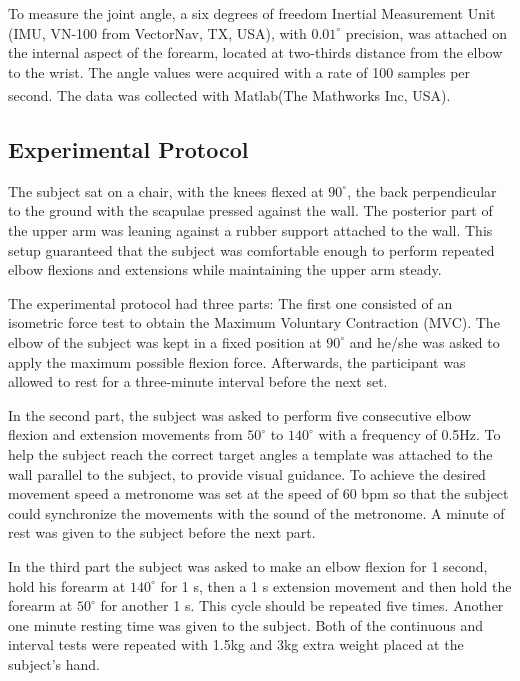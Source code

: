 \documentclass[letterpaper, 10 pt, conference]{ieeeconf}  %
\begin{document}
  To measure the joint angle, a six degrees of freedom Inertial Measurement Unit (IMU, VN-100 from VectorNav, TX, USA), with \(0.01^{\circ}\) precision, was attached on the internal aspect of the forearm, located at two-thirds distance from the elbow to the wrist. The angle values were acquired with a rate of 100 samples per second. The data was collected with Matlab\textsuperscript{\textregistered}(The Mathworks Inc, USA).

\subsection{Experimental Protocol}


The subject sat on a chair, with the knees flexed at \(90^{\circ}\), the back perpendicular to the ground with the scapulae pressed against the wall. The posterior part of the upper arm was leaning against a rubber support attached to the wall. This setup guaranteed that the subject was comfortable enough to perform repeated elbow flexions and extensions while maintaining the upper arm steady. 

The experimental protocol had three parts: The first one consisted of an isometric force test to obtain the Maximum Voluntary Contraction (MVC). The elbow of the subject was kept in a fixed position at \(90^{\circ}\) and he/she was asked to apply the maximum possible flexion force. Afterwards, the participant was allowed to rest for a three-minute interval before the next set.

In the second part, the subject was asked to perform five consecutive elbow flexion and extension movements from  \(50^{\circ}\) to \(140^{\circ}\) with a frequency of 0.5Hz. To help the subject reach the correct target angles a template was attached to the wall parallel to the subject, to provide visual guidance. To achieve the desired movement speed a metronome was set at the speed of 60 bpm so that the subject could synchronize the movements with the sound of the metronome. A minute of rest was given to the subject before the next part.

In the third part the subject was asked to make an elbow flexion for 1 second, hold his forearm at \(140^{\circ}\) for 1 s, then a 1 s extension movement and then hold the forearm at \(50^{\circ}\) for another 1 s. This cycle should be repeated five times. Another one minute resting time was given to the subject.
Both of the continuous and interval tests were repeated with 1.5kg and 3kg extra weight placed at the subject's hand.
\end{document}
